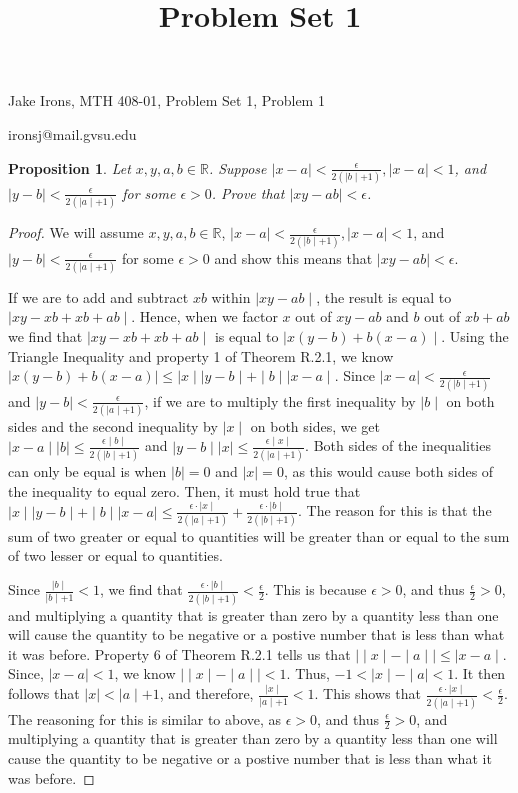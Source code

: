 \documentclass[11 pt]{article}
\title{Problem Set 1}
\newtheorem{proposition}{Proposition}
\newcommand{\newpar}{\vspace{.15in}\noindent}
\begin{document}
\noindent Jake Irons, MTH 408-01, Problem Set 1, Problem 1

\noindent ironsj@mail.gvsu.edu
\newpar
\begin{proposition}
Let $x, y, a, b \in \mathbb{R}$. Suppose $\mid x-a\mid<\frac{\epsilon}{2(\mid b\mid+1)}, \mid x-a\mid<1$, and  $\mid y-b\mid<\frac{\epsilon}{2(\mid a\mid+1)}$ for some $\epsilon>0$. Prove that $\mid xy-ab\mid<\epsilon$.
\end{proposition}
\begin{proof}
We will assume $x, y, a, b \in \mathbb{R}$, $\mid x-a\mid<\frac{\epsilon}{2(\mid b\mid+1)}, \mid x-a\mid<1$, and  $\mid y-b\mid<\frac{\epsilon}{2(\mid a\mid+1)}$ for some $\epsilon>0$ and show this means that $\mid xy-ab\mid<\epsilon$.


\newpar
If we are to add and subtract $xb$ within $\mid xy-ab\mid$, the result is equal to $\mid xy-xb+xb+ab\mid$. Hence, when we factor $x$ out of $xy-ab$ and $b$ out of $xb+ab$ we find that $\mid xy-xb+xb+ab\mid$ is equal to $\mid x(y-b)+b(x-a)\mid$. Using the Triangle Inequality and property 1 of Theorem R.2.1, we know $\mid x(y-b)+b(x-a)\mid\le \mid x\mid\mid y-b\mid+\mid b\mid\mid x-a\mid$. Since $\mid x-a\mid<\frac{\epsilon}{2(\mid b\mid+1)}$ and $\mid y-b\mid<\frac{\epsilon}{2(\mid a\mid+1)}$, if we are to multiply the first inequality by $\mid b \mid$ on both sides and the second inequality by $\mid x \mid$ on both sides, we get $\mid x-a\mid\mid b\mid\le\frac{\epsilon\mid b\mid}{2(\mid b\mid+1)}$ and $\mid y-b\mid\mid x\mid\le\frac{\epsilon\mid x\mid}{2(\mid a\mid+1)}$. Both sides of the inequalities can only be equal is when $\mid b\mid=0$ and $\mid x\mid=0$, as this would cause both sides of the inequality to equal zero. Then, it must hold true that $\mid x\mid\mid y-b\mid+\mid b\mid\mid x-a\mid\le \frac{\epsilon\cdot\mid x\mid}{2(\mid a\mid+1)}+\frac{\epsilon\cdot\mid b\mid}{2(\mid b\mid+1)}$. The reason for this is that the sum of two greater or equal to quantities will be greater than or equal to the sum of two lesser or equal to quantities.  

\newpar
Since $\frac{\mid b \mid}{\mid b\mid+1}<1$, we find that $\frac{\epsilon\cdot\mid b\mid}{2(\mid b\mid+1)}<\frac{\epsilon}{2}$. This is because $\epsilon>0$, and thus $\frac{\epsilon}{2}>0$, and multiplying a quantity that is greater than zero by a quantity less than one will cause the quantity to be negative or a postive number that is less than what it was before. Property 6 of Theorem R.2.1 tells us that $\mid\mid x\mid-\mid a\mid\mid\le \mid x-a\mid$. Since, $\mid x-a\mid<1$, we know $\mid\mid x\mid-\mid a\mid\mid<1$. Thus, $-1<\mid x\mid-\mid a\mid<1$. It then follows that $\mid x\mid<\mid a\mid+1$, and therefore, $\frac{\mid x\mid}{\mid a\mid+1}<1$. This shows that $\frac{\epsilon\cdot\mid x\mid}{2(\mid a\mid+1)}<\frac{\epsilon}{2}$. The reasoning for this is similar to above, as $\epsilon>0$, and thus $\frac{\epsilon}{2}>0$, and multiplying a quantity that is greater than zero by a quantity less than one will cause the quantity to be negative or a postive number that is less than what it was before.




\end{proof}
\end{document}
